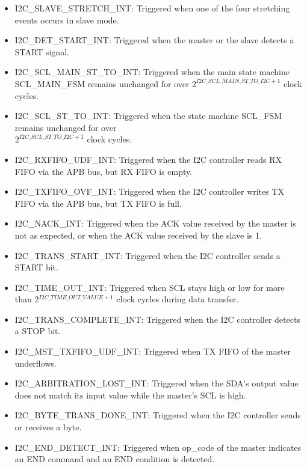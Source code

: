 \documentclass[main\_\_EN.tex]{subfiles}
\begin{document}
\begin{itemize}
\item \label{int:i2c-slave-stretch}I2C\_SLAVE\_STRETCH\_INT: Triggered when one of the four stretching events occurs in slave mode.
\item \label{int:i2c-start}I2C\_DET\_START\_INT: Triggered when the master or the slave detects a START signal.
\item \label{int:i2c-scl-main-fsm}I2C\_SCL\_MAIN\_ST\_TO\_INT: Triggered when the main state machine SCL\_MAIN\_FSM remains unchanged for over \(2^{\hyperref[fielddesc:I2CSCLMAINSTTOI2C]{I2C\_SCL\_MAIN\_ST\_TO\_I2C}+1}\) clock cycles.
\item \label{int:i2c-scl-fsm}I2C\_SCL\_ST\_TO\_INT: Triggered when the state machine SCL\_FSM remains unchanged for over \\\(2^{\hyperref[fielddesc:I2CSCLSTTOI2C]{I2C\_SCL\_ST\_TO\_I2C}+1}\) clock cycles.
\item \label{int:i2c-rxfifo-udf}I2C\_RXFIFO\_UDF\_INT: Triggered when the I2C controller reads RX FIFO via the APB bus, but RX FIFO is empty.
\item \label{int:i2c-txfifo-ovf}I2C\_TXFIFO\_OVF\_INT: Triggered when the I2C controller writes TX FIFO via the APB bus, but TX FIFO is full.
\item \label{int:i2c-nack}I2C\_NACK\_INT: Triggered when the ACK value received by the master is not as expected, or when the ACK value received by the slave is 1.
\item \label{int:i2c-trans-start}I2C\_TRANS\_START\_INT: Triggered when the I2C controller sends a START bit.
\item \label{int:i2c-time-out}I2C\_TIME\_OUT\_INT: Triggered when SCL stays high or low for more than 2$^{\hyperref[fielddesc:I2CTIMEOUTVALUE]{I2C\_TIME\_OUT\_VALUE}+1}$ clock cycles during data transfer.
\item \label{int:i2c-trans-complete}I2C\_TRANS\_COMPLETE\_INT: Triggered when the I2C controller detects a STOP bit.
\item \label{int:i2c-mst-txfifo-udf}I2C\_MST\_TXFIFO\_UDF\_INT: Triggered when TX FIFO of the master underflows.
\item \label{int:i2c-arbitration-lost}I2C\_ARBITRATION\_LOST\_INT: Triggered when the SDA's output value does not match its input value while the master's SCL is high.
\item \label{int:i2c-byte-trans-done}I2C\_BYTE\_TRANS\_DONE\_INT: Triggered when the I2C controller sends or receives a byte.
\item \label{int:i2c-end}I2C\_END\_DETECT\_INT: Triggered when op\_code of the master indicates an END command and an END condition is detected.

\end{itemize}
\end{document}
